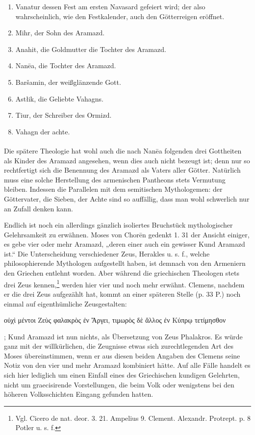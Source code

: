 \documentclass{article}
\begin{document}
\begin{enumerate}
    \item Vanatur dessen Fest am ersten Navasard gefeiert wird; der also wahrscheinlich, wie den Festkalender, auch den Götterreigen eröffnet.

    \item Mihr, der Sohn des Aramazd.

    \item Anahit, die Goldmutter die Tochter des Aramazd.

    \item Nanēa, die Tochter des Aramazd.

    \item Baršamin, der weißglänzende Gott.

    \item Astłik, die Geliebte Vahagns.

    \item Tiur, der Schreiber des Ormizd.

    \item Vahagn der achte.
\end{enumerate}
\paragraph{}
Die spätere Theologie hat wohl auch die nach Nanēa folgenden drei Gottheiten als Kinder des Aramazd angesehen, wenn dies auch nicht bezeugt ist; denn nur so rechtfertigt sich die Benennung des Aramazd als Vaters aller Götter. Natürlich muss eine solche Herstellung des armenischen Pantheons stets Vermutung bleiben. Indessen die Parallelen mit dem semitischen Mythologemen: der Göttervater, die Sieben, der Achte sind so auffällig, dass man wohl schwerlich nur an Zufall denken kann.

Endlich ist noch ein allerdings gänzlich isoliertes Bruchstück mythologischer Gelehrsamkeit zu erwähnen. Moses von Chorēn gedenkt 1. 31 der Ansicht einiger, es gebe vier oder mehr Aramazd, „deren einer auch ein gewisser Kund Aramazd ist.“ Die Unterscheidung verschiedener Zeus, Herakles u. s. f., welche philosophierende Mythologen aufgestellt haben, ist demnach von den Armeniern den Griechen entlehnt worden. Aber während die griechischen Theologen stets drei Zeus kennen,\footnote{Vgl. Cicero de nat. deor. 3. 21. Ampelius 9. Clement. Alexandr. Protrept. p. 8 Potler u. s. f.} werden hier vier und noch mehr erwähnt. Clemens, nachdem er die drei Zeus aufgezählt hat, kommt an einer späteren Stelle (p. 33 P.) noch einmal auf eigenthümliche Zeusgestalten: \begin{greek}οὐχὶ μέντοι Ζεὺς φαλακρὸς ἐν Ἄργει, τιμωρὸς δὲ ἄλλος ἐν Κύπρῳ τετίμησθον\end{greek}; Kund Aramazd ist nun nichts, als Übersetzung von Zeus Phalakros. Es würde ganz mit der willkürlichen, die Zeugnisse etwas sich zurechtlegenden Art des Moses übereinstimmen, wenn er aus diesen beiden Angaben des Clemens seine Notiz von den vier und mehr Aramazd kombiniert hätte. Auf alle Fälle handelt es sich hier lediglich um einen Einfall eines des Griechischen kundigen Gelehrten, nicht um graecisirende Vorstellungen, die beim Volk oder wenigstens bei den höheren Volksschichten Eingang gefunden hatten.
\end{document}
